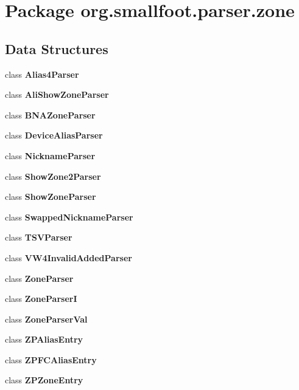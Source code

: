 \section{Package org.\+smallfoot.\+parser.\+zone}
\label{namespaceorg_1_1smallfoot_1_1parser_1_1zone}
\subsection*{Data Structures}
\begin{DoxyCompactItemize}
\item 
class {\bf Alias4\+Parser}
\item 
class {\bf Ali\+Show\+Zone\+Parser}
\item 
class {\bf B\+N\+A\+Zone\+Parser}
\item 
class {\bf Device\+Alias\+Parser}
\item 
class {\bf Nickname\+Parser}
\item 
class {\bf Show\+Zone2\+Parser}
\item 
class {\bf Show\+Zone\+Parser}
\item 
class {\bf Swapped\+Nickname\+Parser}
\item 
class {\bf T\+S\+V\+Parser}
\item 
class {\bf V\+W4\+Invalid\+Added\+Parser}
\item 
class {\bf Zone\+Parser}
\item 
class {\bf Zone\+Parser\+I}
\item 
class {\bf Zone\+Parser\+Val}
\item 
class {\bf Z\+P\+Alias\+Entry}
\item 
class {\bf Z\+P\+F\+C\+Alias\+Entry}
\item 
class {\bfseries Z\+P\+Zone\+Entry}
\end{DoxyCompactItemize}
